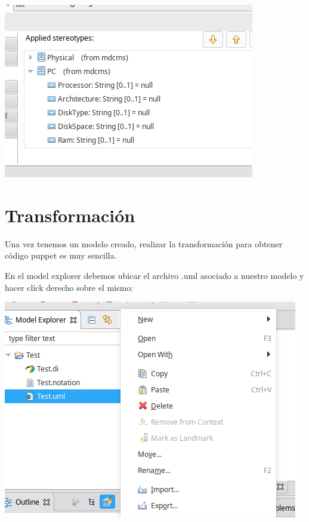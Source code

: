 \documentclass[11pt]{article}
\begin{document}
\begin{center}
\includegraphics[width=.9\linewidth]{images/modelo_6.png}
\end{center}

\section{Transformación}
\label{sec:org2b6f134}

Una vez tenemos un modelo creado, realizar la transformación para
obtener código puppet es muy sencilla.

En el model explorer debemos ubicar el archivo .uml asociado a nuestro
modelo y hacer click derecho sobre el mismo:

\begin{center}
\includegraphics[width=.9\linewidth]{images/transformacion_1.png}
\end{center}
\end{document}

